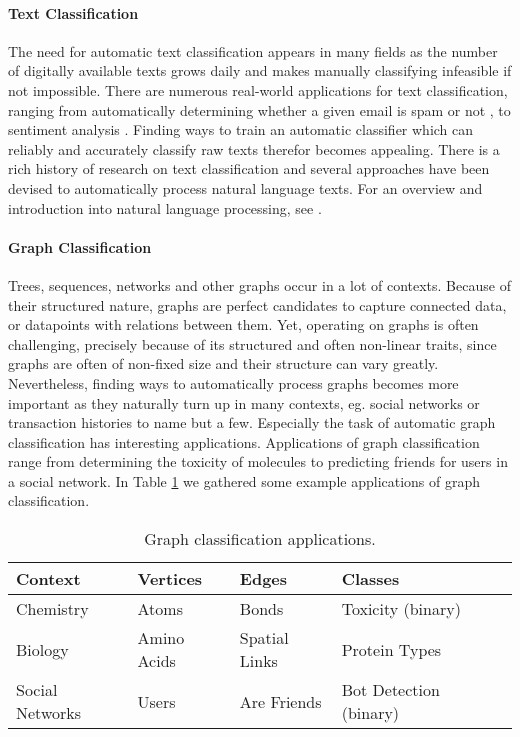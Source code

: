 
\paragraph{Text Classification}
The need for automatic text classification appears in many fields as the number of digitally available texts grows daily and makes manually classifying infeasible if not impossible.
There are numerous real-world applications for text classification, ranging from automatically determining whether a given email is spam or not \cite{Yu2008}, to sentiment analysis \cite{Liu2012}.
Finding ways to train an automatic classifier which can reliably and accurately classify raw texts therefor becomes appealing.
There is a rich history of research on text classification and several approaches have been devised to automatically process natural language texts.
For an overview and introduction into natural language processing, see \cite{Manning2000}.

\paragraph{Graph Classification}
Trees, sequences, networks and other graphs occur in a lot of contexts.
Because of their structured nature, graphs are perfect candidates to capture connected data, or datapoints with relations between them.
Yet, operating on graphs is often challenging, precisely because of its structured and often non-linear traits, since graphs are often of non-fixed size and their structure can vary greatly.
Nevertheless, finding ways to automatically process graphs becomes more important as they naturally turn up in many contexts, eg. social networks or transaction histories to name but a few.
Especially the task of automatic graph classification has interesting applications.
Applications of graph classification range from determining the toxicity of molecules to predicting friends for users in a social network.
In Table \ref{table:graph_classification_examples} we gathered some example applications of graph classification.

\begin{table}[htb!]
\centering
\renewcommand*{\arraystretch}{0.95}
\begin{tabular}{llllr}
Context & Vertices & Edges & Classes &  \\
\midrule
Chemistry & Atoms & Bonds & Toxicity (binary) & \cite{Mahe2005} \\
Biology & Amino Acids & Spatial Links & Protein Types & \cite{Vazquez2008} \\ 
Social Networks & Users & Are Friends & Bot Detection (binary) & \cite{Wang2014} \\
\bottomrule
\end{tabular}%
\caption[Table: Graph Classification Applications]{Graph classification applications.}%
\label{table:graph_classification_examples}
\end{table}

